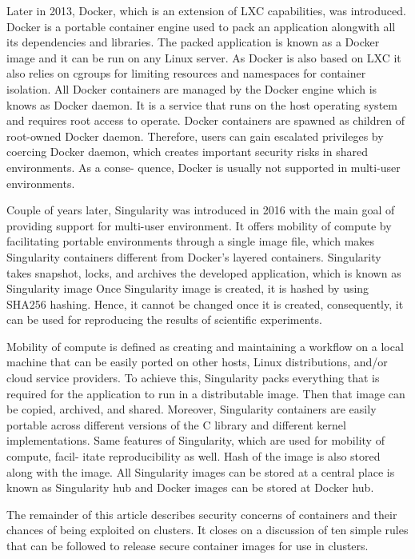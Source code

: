 \documentclass[a4paper,num-refs]{oup-contemporary}
\begin{document}
Later in 2013, Docker, which is an extension of LXC capabilities, was introduced.
Docker is a portable container engine used to pack an application
alongwith all its dependencies and libraries. The packed application is known as
a Docker image and it can be run on any Linux server. As Docker is also based
on LXC it also relies on cgroups for limiting resources and namespaces for
container isolation. All Docker containers are managed by the Docker engine
which is knows as Docker daemon. It is a service that runs on the host operating
system and requires root access to operate. Docker containers are
spawned as children of root-owned Docker daemon. Therefore,
users can gain escalated privileges by coercing Docker daemon,
which creates important security risks in shared environments. As a conse-
quence, Docker is usually not supported in multi-user environments.

Couple of years later, Singularity was introduced in 2016 with the main goal
of providing support for multi-user environment.
It offers mobility of compute by facilitating portable environments through 
a single image file, which makes Singularity containers different from 
Docker’s layered containers. Singularity takes snapshot, locks, and 
archives the developed application, which is known as Singularity image
Once Singularity image is created, it is hashed by using SHA256 hashing. 
Hence, it cannot be changed once it is created, consequently, it can be 
used for reproducing the results of scientific experiments.

Mobility of compute is defined as creating and maintaining a workflow on
a local machine that can be easily ported on other hosts, Linux distributions,
and/or cloud service providers. To achieve this, Singularity packs everything
that is required for the application to run in a distributable image. Then that
image can be copied, archived, and shared. Moreover, Singularity containers
are easily portable across different versions of the C library and different kernel
implementations.
Same features of Singularity, which are used for mobility of compute, facil-
itate reproducibility as well. Hash of the image is also stored along with the
image. All Singularity images can be stored at a central place is known as
Singularity hub and Docker images can be stored at Docker hub.

The remainder of this article describes security concerns of containers
and their chances of being exploited on clusters. It closes on a discussion
of ten simple rules that can be followed to release secure container images
for use in clusters.
\end{document}
